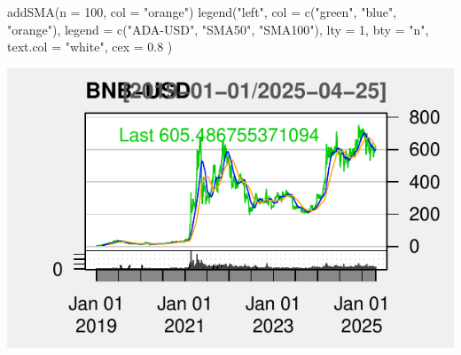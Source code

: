 \documentclass[]{tufte-handout}
\newenvironment{Shaded}{}{}
\newcommand{\AttributeTok}[1]{\textcolor[rgb]{0.49,0.56,0.16}{#1}}
\newcommand{\DecValTok}[1]{\textcolor[rgb]{0.25,0.63,0.44}{#1}}
\newcommand{\FloatTok}[1]{\textcolor[rgb]{0.25,0.63,0.44}{#1}}
\newcommand{\FunctionTok}[1]{\textcolor[rgb]{0.02,0.16,0.49}{#1}}
\newcommand{\NormalTok}[1]{#1}
\newcommand{\OtherTok}[1]{\textcolor[rgb]{0.00,0.44,0.13}{#1}}
\newcommand{\SpecialCharTok}[1]{\textcolor[rgb]{0.25,0.44,0.63}{#1}}
\newcommand{\StringTok}[1]{\textcolor[rgb]{0.25,0.44,0.63}{#1}}
\begin{document}
\begin{Shaded}
\begin{Highlighting}[]
\FunctionTok{addSMA}\NormalTok{(}\AttributeTok{n =} \DecValTok{100}\NormalTok{, }\AttributeTok{col =} \StringTok{"orange"}\NormalTok{)}
\FunctionTok{legend}\NormalTok{(}\StringTok{"left"}\NormalTok{,}
  \AttributeTok{col =} \FunctionTok{c}\NormalTok{(}\StringTok{"green"}\NormalTok{, }\StringTok{"blue"}\NormalTok{, }\StringTok{"orange"}\NormalTok{),}
  \AttributeTok{legend =} \FunctionTok{c}\NormalTok{(}\StringTok{"ADA{-}USD"}\NormalTok{, }\StringTok{"SMA50"}\NormalTok{, }\StringTok{"SMA100"}\NormalTok{), }\AttributeTok{lty =} \DecValTok{1}\NormalTok{, }\AttributeTok{bty =} \StringTok{"n"}\NormalTok{,}
  \AttributeTok{text.col =} \StringTok{"white"}\NormalTok{, }\AttributeTok{cex =} \FloatTok{0.8}
\NormalTok{)}
\end{Highlighting}
\end{Shaded}

\includegraphics{cripto_update_files/figure-latex/unnamed-chunk-8-3}

\begin{Shaded}
\end{Shaded}
\end{document}
